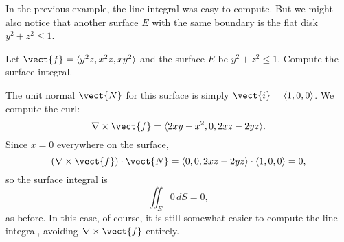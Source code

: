 In the previous example, the line integral was easy to
compute. But we might also notice that another surface $E$ with the
same boundary is the flat disk $y^2+z^2\le 1$. 

\begin{example}{}{}
Let $\vect{f}=\langle  y^2z,x^2z,xy^2 \rangle$ and the surface $E$ be $y^2+z^2\le 1$. Compute the surface integral. 
\end{example}

\begin{solution} 
The unit normal $\vect{N}$ for this surface is simply $\vect{i}=\langle 1,0,0\rangle$. We compute
the curl:
$$\nabla\times\vect{f}=\langle 2xy-x^2, 0, 2xz-2yz \rangle.$$ 
Since $x=0$ everywhere on the surface,
$$(\nabla\times\vect{f})\cdot \vect{N}=
\langle 0, 0, 2xz-2yz \rangle\cdot\langle 1,0,0\rangle=0,$$
so the surface integral is
$$\iint_{E}0\,dS=0,$$
as before. In this case, of course, it is still somewhat easier to
compute the line integral, avoiding $\nabla\times\vect{f}$ entirely.
\end{solution}





